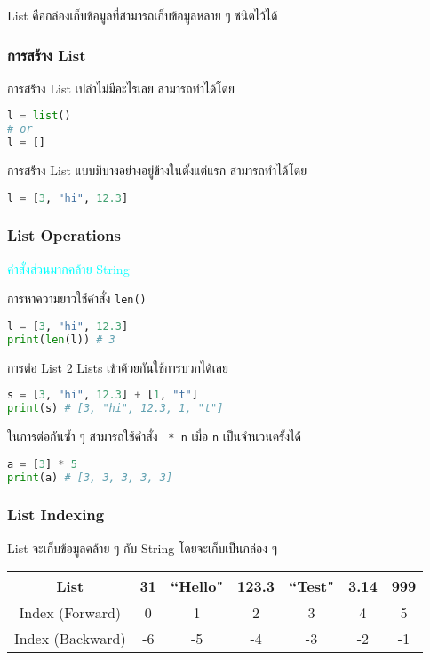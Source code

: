 List คือกล่องเก็บข้อมูลที่สามารถเก็บข้อมูลหลาย ๆ ชนิดไว้ได้

\subsubsection{การสร้าง List}

การสร้่าง List เปล่าไม่มีอะไรเลย สามารถทำได้โดย

\begin{lstlisting}[language=Python]
l = list()
# or
l = []
\end{lstlisting}

การสร้่าง List แบบมีบางอย่างอยู่ข้างในตั้งแต่แรก สามารถทำได้โดย

\begin{lstlisting}[language=Python]
l = [3, "hi", 12.3]
\end{lstlisting}

\subsubsection{List Operations}

\textcolor{cyan}{คำสั่งส่วนมากคล้าย String}

การหาความยาวใช้่คำสั่ง \verb|len()|

\begin{lstlisting}[language=Python]
l = [3, "hi", 12.3]
print(len(l)) # 3
\end{lstlisting}

การต่อ List 2 Lists เข้าด้วยกันใช้การบวกได้เลย

\begin{lstlisting}[language=Python]
s = [3, "hi", 12.3] + [1, "t"]
print(s) # [3, "hi", 12.3, 1, "t"]
\end{lstlisting}

ในการต่อกันซ้ำ ๆ สามารถใช้คำสั่ง \verb | * n| เมื่อ \verb|n| เป็นจำนวนครั้งได้

\begin{lstlisting}[language=Python]
a = [3] * 5
print(a) # [3, 3, 3, 3, 3]
\end{lstlisting}

\subsubsection{List Indexing}

List จะเก็บข้อมูลคล้าย ๆ กับ String โดยจะเก็บเป็นกล่อง ๆ 

\begin{center}
    \begin{tabular}{|c|c|c|c|c|c|c|}
         \hline
         List & 31 & ``Hello" & 123.3 & ``Test" & 3.14 & 999\\
         \hline
         Index (Forward) & 0 & 1 & 2 & 3 & 4 & 5\\
         \hline
         Index (Backward) & -6 & -5 & -4 & -3 & -2 & -1\\
         \hline
    \end{tabular}
\end{center}

